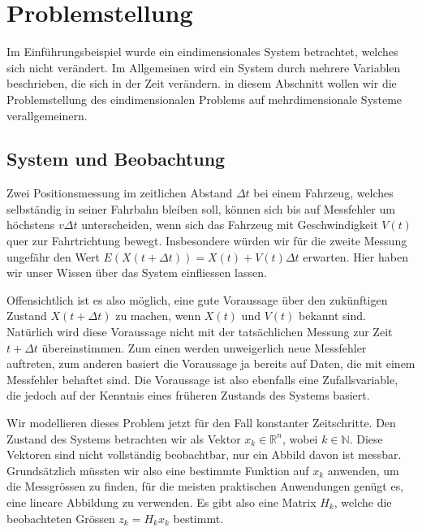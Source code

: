 %
%
%

\section{Problemstellung}
Im Einführungsbeispiel wurde ein eindimensionales System betrachtet,
welches sich nicht verändert.
Im Allgemeinen wird ein System durch
mehrere Variablen beschrieben, die sich in der Zeit verändern.
in diesem Abschnitt wollen wir die Problemstellung des eindimensionalen
Problems auf mehrdimensionale Systeme verallgemeinern.

\subsection{System und Beobachtung}
Zwei Positionsmessung im zeitlichen Abstand $\Delta t$
bei einem Fahrzeug, welches selbständig
in seiner Fahrbahn bleiben soll, können sich bis auf Messfehler um höchstens
$v\Delta t$ unterscheiden, wenn sich das Fahrzeug mit Geschwindigkeit $V(t)$
quer zur Fahrtrichtung bewegt.
Insbesondere würden wir für die zweite
Messung ungefähr den Wert $E(X(t+\Delta t)) = X(t) + V(t)\Delta t$
erwarten.
Hier haben wir unser Wissen über das System einfliessen lassen.

Offensichtlich ist es also möglich, eine gute Voraussage über den
zukünftigen Zustand $X(t+\Delta t)$ zu machen, wenn $X(t)$ und $V(t)$
bekannt sind.
Natürlich wird diese Voraussage nicht mit der tatsächlichen
Messung zur Zeit $t+\Delta t$ übereinstimmen.
Zum einen werden unweigerlich
neue Messfehler auftreten, zum anderen basiert die Voraussage ja bereits
auf Daten, die mit einem Messfehler behaftet sind.
Die Voraussage ist also
ebenfalls eine Zufallsvariable, die jedoch auf der Kenntnis eines früheren
Zustands des Systems basiert.

Wir modellieren dieses Problem jetzt für den Fall konstanter Zeitschritte.
Den Zustand des Systems betrachten wir als Vektor $x_k\in\mathbb{R}^n$,
wobei $k\in\mathbb{N}$.
Diese Vektoren sind nicht vollständig beobachtbar,
nur ein Abbild davon ist messbar.
Grundsätzlich müssten wir also eine
bestimmte Funktion auf $x_k$ anwenden, um die Messgrössen zu finden,
für die meisten praktischen Anwendungen genügt es, eine lineare Abbildung
zu verwenden.
Es gibt also eine Matrix $H_k$, welche die beobachteten
Grössen $z_k=H_kx_k$ bestimmt.


